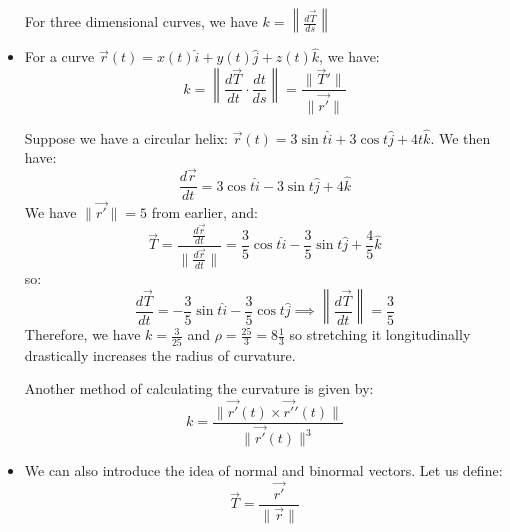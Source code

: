 \begin{itemize}
\begin{equation}
    \end{equation}
    \begin{definition}
        For three dimensional curves, we have $k= \left\lVert \frac{d\vec{T}}{ds} \right\rVert$
    \end{definition}
    \item For a curve $\vec{r}(t) = x(t)\hat{i} + y(t)\hat{j} + z(t) \hat{k}$, we have:
    \begin{equation}
        k = \left\lVert \frac{d\vec{T}}{dt} \cdot \frac{dt}{ds}\right\rVert = \frac{\lVert \vec{T}' \rVert}{\lVert \vec{r'} \rVert}
    \end{equation}
    \begin{example}
        Suppose we have a circular helix: $\vec{r}(t) = 3\sin t \hat{i} + 3\cos t\hat{j} + 4t\hat{k}$. We then have:
        \begin{equation}
            \frac{d\vec{r}}{dt} = 3\cos t \hat{i} - 3\sin t \hat{j} + 4\hat{k}
        \end{equation}
        We have $\lVert \vec{r'} \rVert = 5$ from earlier, and:
        \begin{equation}
            \vec{T} = \frac{\frac{d\vec{r}}{dt}}{\lVert \frac{d\vec{r}}{dt} \rVert} = \frac{3}{5}\cos t\hat{i} - \frac{3}{5}\sin t \hat{j} + \frac{4}{5}\hat{k}
        \end{equation}
        so:
        \begin{equation}
            \frac{d\vec{T}}{dt} = - \frac{3}{5}\sin t \hat{i} - \frac{3}{5}\cos t\hat{j} \implies \left\lVert \frac{d\vec{T}}{dt} \right\rVert = \frac{3}{5}
        \end{equation}
        Therefore, we have $k=\frac{3}{25}$ and $\rho = \frac{25}{3} = 8\frac{1}{3}$ so stretching it longitudinally drastically increases the radius of curvature.
    \end{example}
    \begin{idea}
        Another method of calculating the curvature is given by:
        \begin{equation}
            k = \frac{\lVert \vec{r'}(t) \times \vec{r'}'(t)\rVert}{\lVert\vec{r'}(t)\rVert^3}
        \end{equation}
    \end{idea}
    \item We can also introduce the idea of normal and binormal vectors. Let us define:
    \begin{equation}
        \vec{T} = \frac{\vec{r'}}{\lVert \vec{r} \rVert}
    \end{equation}

\end{itemize}
